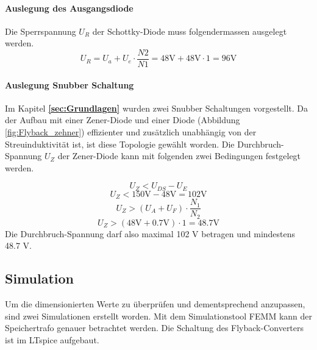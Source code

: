 \paragraph{Auslegung des Ausgangsdiode}
Die Sperrspannung $ U_{R} $ der Schottky-Diode muss folgendermassen ausgelegt werden.
\begin{equation}\label{eq:sperrspannung_diode}
U_{R} = U_{a} + U_{e} \cdot \frac{N2}{N1} = 48\mathrm{V} + 48\mathrm{V} \cdot 1 = 96\mathrm{V}
\end{equation}

\paragraph{Auslegung  Snubber Schaltung}
Im Kapitel \textbf{\ref{sec:Grundlagen} } wurden zwei Snubber Schaltungen vorgestellt. Da der Aufbau mit einer Zener-Diode und einer Diode (Abbildung \ref{fig:Flyback_zehner}) effizienter und zusätzlich unabhängig von der Streuinduktivität ist, ist diese Topologie gewählt worden. Die Durchbruch-Spannung $ U_{Z} $ der Zener-Diode kann mit folgenden zwei Bedingungen festgelegt werden.  

\begin{equation}\label{eq:sperrspannung_zener1}
U_{Z} < U_{DS} - U_{E}
\end{equation}
\begin{equation}\label{eq:sperrspannung_zener1_berechnet}
U_{Z} <  150\mathrm{V} - 48\mathrm{V}  = 102\mathrm{V}
\end{equation}
\begin{equation}\label{eq:sperrspannung_zehner2}
U_{Z} > (U_{A} + U_{F}) \cdot \frac{N_{1}}{N_{2}}
\end{equation}
\begin{equation}\label{eq:sperrspannung_zehner2_berechnet}
U_{Z} >(48\mathrm{V} + 0.7\mathrm{V}) \cdot 1 = 48.7\mathrm{V}
\end{equation}
Die Durchbruch-Spannung darf also maximal 102 V betragen und mindestens 48.7 V.




\subsection{Simulation}\label{sec:simulation}
Um die dimensionierten Werte zu überprüfen und dementsprechend anzupassen, sind zwei Simulationen erstellt worden. Mit dem Simulationstool FEMM kann der Speichertrafo genauer betrachtet werden. Die Schaltung des Flyback-Converters ist im LTspice aufgebaut.

